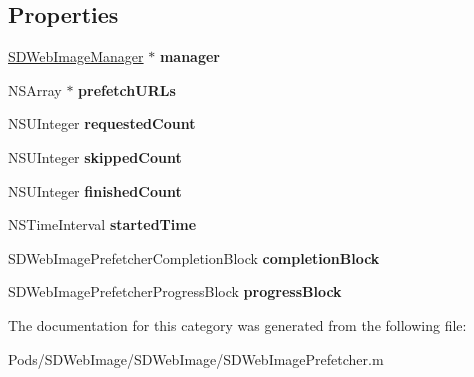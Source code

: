 \subsection*{Properties}
\begin{DoxyCompactItemize}
\item 
\mbox{\label{category_s_d_web_image_prefetcher_07_08_a9e35f9996e6dae2a5d09aadf1fd673c3}} 
\mbox{\hyperlink{interface_s_d_web_image_manager}{S\+D\+Web\+Image\+Manager}} $\ast$ {\bfseries manager}
\item 
\mbox{\label{category_s_d_web_image_prefetcher_07_08_a19684fa5375c798b3c960f590162ba14}} 
N\+S\+Array $\ast$ {\bfseries prefetch\+U\+R\+Ls}
\item 
\mbox{\label{category_s_d_web_image_prefetcher_07_08_a04e5e34aee014e791495a443b6980e83}} 
N\+S\+U\+Integer {\bfseries requested\+Count}
\item 
\mbox{\label{category_s_d_web_image_prefetcher_07_08_aaa9539ca9ac09907b74fcbc05b82facf}} 
N\+S\+U\+Integer {\bfseries skipped\+Count}
\item 
\mbox{\label{category_s_d_web_image_prefetcher_07_08_a52053a7d1470e158f9e2b7baaf7d244b}} 
N\+S\+U\+Integer {\bfseries finished\+Count}
\item 
\mbox{\label{category_s_d_web_image_prefetcher_07_08_a3fd1f7b1ba9d906fe568a5ca796b5331}} 
N\+S\+Time\+Interval {\bfseries started\+Time}
\item 
\mbox{\label{category_s_d_web_image_prefetcher_07_08_a31dc5453af46cad5dc93e3f2de03d94f}} 
S\+D\+Web\+Image\+Prefetcher\+Completion\+Block {\bfseries completion\+Block}
\item 
\mbox{\label{category_s_d_web_image_prefetcher_07_08_a0606e1389270ff7fae6370c1942dff22}} 
S\+D\+Web\+Image\+Prefetcher\+Progress\+Block {\bfseries progress\+Block}
\end{DoxyCompactItemize}


The documentation for this category was generated from the following file\+:\begin{DoxyCompactItemize}
\item 
Pods/\+S\+D\+Web\+Image/\+S\+D\+Web\+Image/S\+D\+Web\+Image\+Prefetcher.\+m\end{DoxyCompactItemize}
